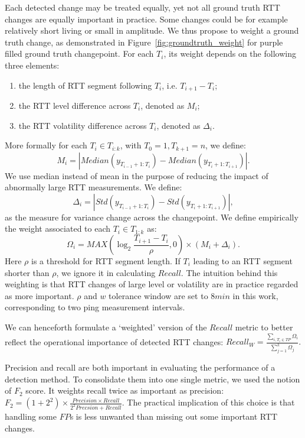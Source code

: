 Each detected change may be treated equally, yet not all ground truth RTT changes are equally important in practice.
Some changes could be for example relatively short living or small in amplitude.
We thus propose to weight a ground truth change, as demonstrated in Figure~\ref{fig:groundtruth_weight} for purple filled ground truth changepoint.
For each $T_i$, its weight depends on the following three elements:
\begin{enumerate}
\item the length of RTT segment following $T_i$, i.e. $T_{i+1} - T_i$;
\item the RTT level difference across $T_i$, denoted as $M_i$; 
\item the RTT volatility difference across $T_i$, denoted as $\Delta_i$.
\end{enumerate}
More formally for each $T_i \in T_{i:k}$, with $T_0=1, T_{k+1} = n$, we define:
\begin{equation*}
M_i = |Median(y_{T_{i-1}+1:T_i}) - Median(y_{T_i+1:T_{i+1}})|.
\end{equation*}
We use median instead of mean in the purpose of reducing the impact of abnormally large RTT measurements.
We define:
\begin{equation*}
\Delta_i = |Std(y_{T_{i-1}+1:T_i}) - Std(y_{T_i+1:T_{i+1}})|,
\end{equation*}
as the measure for variance change across the changepoint.
We define empirically the weight associated to each $T_i \in T_{1:k}$ as:
\begin{equation*}
\Omega_i = MAX(\log_2\frac{T_{i+1} - T_i}{\rho}, 0) \times (M_i + \Delta_i).
\end{equation*}
Here $\rho$ is a threshold for RTT segment length. 
If $T_i$ leading to an RTT segment shorter than $\rho$, we ignore it in calculating $Recall$.
The intuition behind this weighting is that RTT changes of large level or volatility are in practice regarded as more important. 
$\rho$ and $w$ tolerance window are set to $8min$ in this work, corresponding to two ping measurement intervals. 

We can henceforth formulate a `weighted' version of the $Recall$ metric to better reflect the operational importance of detected RTT changes: $Recall_W = \frac{\sum_{i, T_i \in TP} \Omega_i}{\sum_{j=1}^k \Omega_j}.$

Precision and recall are both important in evaluating the performance of a detection method.
To consolidate them into one single metric, we used the notion of $F_2$ score.
It weights recall twice as important as precision: $F_2 = (1+2^2) \times \frac{Precision \times Recall}{2^2Precsion + Recall}.$
The practical implication of this choice is that handling some $FP$s is less unwanted than missing out some important RTT changes.

